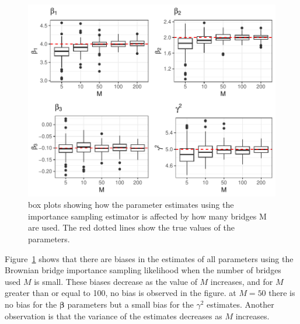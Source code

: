 \begin{figure}[H]
    \centering
    \includegraphics[width=\linewidth]{Images/Results/varying M estimates boxplot BB.pdf}
    \caption[Box plots of Parameter Estimates using Brownian bridge importance sampling using different numbers of bridges]{box plots showing how the parameter estimates using the importance sampling estimator is affected by how many bridges M are used. The red dotted lines show the true values of the parameters.}
    \label{fig:varying M boxplots brownian bridge}
\end{figure}

Figure~\ref{fig:varying M boxplots brownian bridge} shows that there are biases in the estimates of all parameters using the Brownian bridge importance sampling likelihood when the number of bridges used $M$ is small. These biases decrease as the value of $M$ increases, and for $M$ greater than or equal to 100, no bias is observed in the figure. at $M =50$ there is no bias for the $\bm \beta$ parameters but a small bias for the $\gamma^2$ estimates. Another observation is that the variance of the estimates decreases as $M$ increases.



